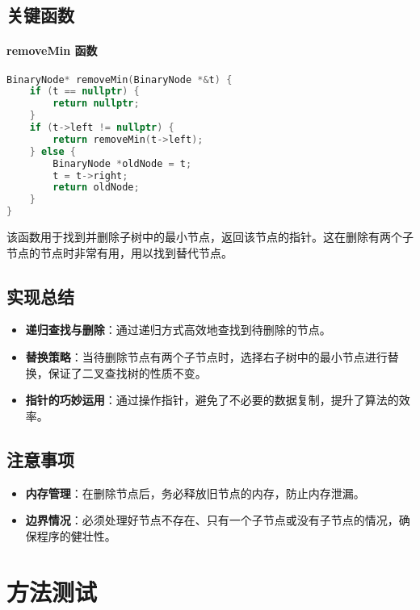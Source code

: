 \documentclass[UTF8]{ctexart}
\begin{document}
\subsection{关键函数}

\paragraph{removeMin 函数}

\begin{lstlisting}[language=C++, caption=removeMin 方法的实现]
BinaryNode* removeMin(BinaryNode *&t) {
    if (t == nullptr) {
        return nullptr;
    }
    if (t->left != nullptr) {
        return removeMin(t->left);
    } else {
        BinaryNode *oldNode = t;
        t = t->right;
        return oldNode;
    }
}
\end{lstlisting}

该函数用于找到并删除子树中的最小节点，返回该节点的指针。这在删除有两个子节点的节点时非常有用，用以找到替代节点。

\subsection{实现总结}

\begin{itemize}
    \item \textbf{递归查找与删除}：通过递归方式高效地查找到待删除的节点。
    \item \textbf{替换策略}：当待删除节点有两个子节点时，选择右子树中的最小节点进行替换，保证了二叉查找树的性质不变。
    \item \textbf{指针的巧妙运用}：通过操作指针，避免了不必要的数据复制，提升了算法的效率。
\end{itemize}

\subsection{注意事项}

\begin{itemize}
    \item \textbf{内存管理}：在删除节点后，务必释放旧节点的内存，防止内存泄漏。
    \item \textbf{边界情况}：必须处理好节点不存在、只有一个子节点或没有子节点的情况，确保程序的健壮性。
\end{itemize}

\section{方法测试}
\end{document}
